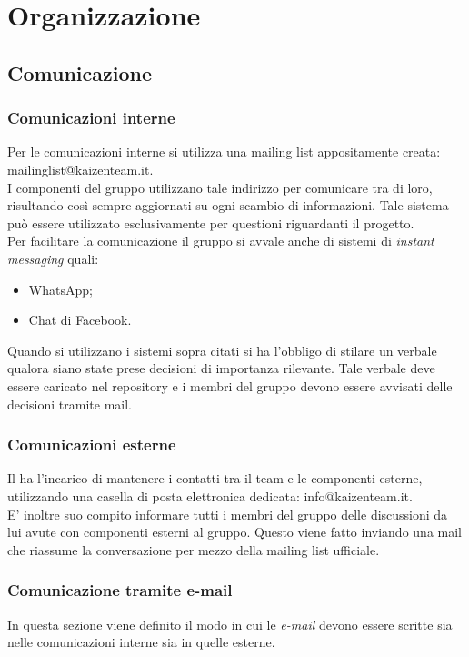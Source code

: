 \section{Organizzazione}
	\subsection{Comunicazione}
		\subsubsection{Comunicazioni interne}
			Per  le comunicazioni interne si utilizza una mailing list appositamente creata: mailinglist@kaizenteam.it.\\
			I componenti del gruppo utilizzano tale indirizzo per comunicare tra di loro, risultando così sempre aggiornati su ogni scambio di informazioni. Tale sistema può essere utilizzato esclusivamente per questioni riguardanti il progetto.\\
			Per facilitare la comunicazione il gruppo si avvale anche di sistemi di \textit{instant messaging} quali:
			\begin{itemize}
				\item WhatsApp;
				\item Chat di Facebook.
			\end{itemize}
			Quando si utilizzano i sistemi sopra citati si ha l'obbligo di stilare un verbale qualora siano state prese decisioni di importanza rilevante. Tale verbale deve essere caricato nel repository e i membri del gruppo devono essere avvisati delle decisioni tramite mail.
		\subsubsection{Comunicazioni esterne}
			Il  ha l’incarico di mantenere i contatti tra il team e le componenti esterne, utilizzando una casella di posta elettronica dedicata: info@kaizenteam.it.\\
			E' inoltre suo compito informare tutti i membri del gruppo delle discussioni da lui avute con componenti esterni al gruppo. Questo viene fatto inviando una mail che riassume la conversazione per mezzo della mailing list ufficiale.
		\subsubsection{Comunicazione tramite e-mail}
			In questa sezione viene definito il modo in cui le \textit{e-mail} devono essere scritte sia nelle comunicazioni interne sia in quelle esterne.
